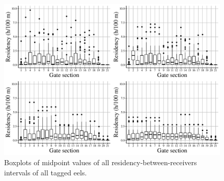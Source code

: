 \begin{figure}[h!]
  \centering\includegraphics[scale=0.45]{overall_uncertainty.pdf}
  \caption{Boxplots of midpoint values of all residency-between-receivers intervals of all tagged eels.}
  \label{fig:overall_uncertainty}
\end{figure}